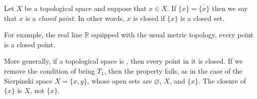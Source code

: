 \documentclass[12pt]{article}
\begin{document}
Let $X$ be a topological space and suppose that $x\in X$. If $\{x\}=\overline{\{x\}}$ then we say that $x$ is a 
\emph{closed point}.  In other words, $x$ is closed if $\lbrace x\rbrace$ is a closed set.

For example, the real line $\mathbb{R}$ equipped with the usual metric topology, every point is a closed point.

More generally, if a topological space is , then every point in it is closed.  If we remove the condition of being $T_1$, then the property fails, as in the case of the Sierpinski space $X=\lbrace x,y\rbrace$, whose open sets are $\varnothing$, $X$, and $\lbrace x \rbrace$.  The closure of $\lbrace x\rbrace$ is $X$, not $\lbrace x\rbrace$.
\end{document}
